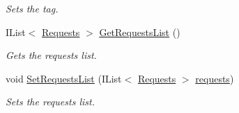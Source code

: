 \begin{DoxyCompactItemize}
\begin{DoxyCompactList}\small\item\em Sets the tag. \end{DoxyCompactList}\item 
I\+List$<$ \hyperlink{classcom_1_1shephertz_1_1app42_1_1paas_1_1sdk_1_1csharp_1_1gift_1_1_gift_1_1_requests}{Requests} $>$ \hyperlink{classcom_1_1shephertz_1_1app42_1_1paas_1_1sdk_1_1csharp_1_1gift_1_1_gift_a065c4bce9e0090cf5e38a2a60804606e}{Get\+Requests\+List} ()
\begin{DoxyCompactList}\small\item\em Gets the requests list. \end{DoxyCompactList}\item 
void \hyperlink{classcom_1_1shephertz_1_1app42_1_1paas_1_1sdk_1_1csharp_1_1gift_1_1_gift_acebc266565ec1e67a5a0a8615d1d62db}{Set\+Requests\+List} (I\+List$<$ \hyperlink{classcom_1_1shephertz_1_1app42_1_1paas_1_1sdk_1_1csharp_1_1gift_1_1_gift_1_1_requests}{Requests} $>$ \hyperlink{classcom_1_1shephertz_1_1app42_1_1paas_1_1sdk_1_1csharp_1_1gift_1_1_gift_afc7c41de2afc7134dc150ea833d71db5}{requests})
\begin{DoxyCompactList}\small\item\em Sets the requests list. \end{DoxyCompactList}\end{DoxyCompactItemize}
